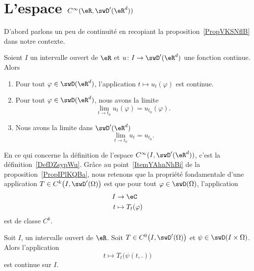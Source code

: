 \section{L'espace \texorpdfstring{\(   C^{\infty}(\eR,\swD'(\eR^d))\)}{C(R,D')}}
\label{SecTEgDVWO}

D'abord parlons un peu de continuité en recopiant la proposition~\ref{PropVKSNflB} dans notre contexte.
\begin{proposition}     \label{PropIPlKQBa}
	Soient \( I\) un intervalle ouvert de \( \eR\) et \( u\colon I\to \swD'(\eR^d)\) une fonction continue. Alors
	\begin{enumerate}
		\item   \label{ItemYAhnNhBi}
		      Pour tout \( \varphi\in\swD(\eR^d)\), l'application \( t\mapsto u_t(\varphi)\) est continue.
		\item
		      Pour tout \( \varphi\in\swD(\eR^d)\), nous avons la limite
		      \begin{equation}
			      \lim_{t\to t_0} u_t(\varphi)=u_{t_0}(\varphi).
		      \end{equation}
		\item
		      Nous avons la limite dans \( \swD'(\eR^d)\)
		      \begin{equation}
			      \lim_{t\to t_0} u_t=u_{t_0}.
		      \end{equation}
	\end{enumerate}
\end{proposition}
En ce qui concerne la définition de l'espace \( C^{\infty}(I,\swD'(\eR^d))\), c'est la définition~\ref{DefDZsypWu}. Grâce au point~\ref{ItemYAhnNhBi} de la proposition~\ref{PropIPlKQBa}, nous retenons que la propriété fondamentale d'une application \( T\in C^k\big( I,\swD'(\Omega) \big)\) est que pour tout \( \varphi\in\swD(\Omega)\), l'application
\begin{equation}
	\begin{aligned}
		I & \to \eC              \\
		t & \mapsto T_t(\varphi)
	\end{aligned}
\end{equation}
est de classe \( C^k\).

\begin{proposition} \label{PropOTlWzog}
	Soit \( I\), un intervalle ouvert de \( \eR\). Soit \( T\in C^0\big( I,\swD'(\Omega) \big)\) et \( \psi\in\swD(I\times \Omega)\). Alors l'application
	\begin{equation}
		t\mapsto T_t\big( \psi(t,.) \big)
	\end{equation}
	est continue sur \( I\).
\end{proposition}

